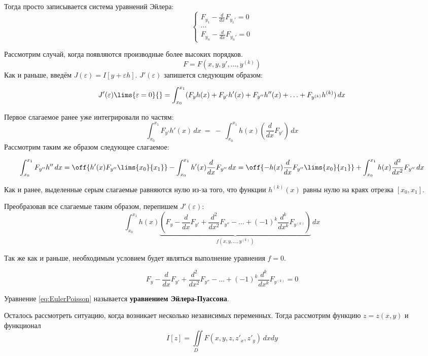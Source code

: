 	Тогда просто записывается система уравнений Эйлера:
	$$\left\{
	  \begin{aligned}
	  	  F_{y_1} - \frac{d}{dx}F_{y_1'} = 0 \\
	  	  \dots\\
	  	  F_{y_n} - \frac{d}{dx}F_{y_n'} = 0
	  \end{aligned}
	  \right.$$
	
	Рассмотрим случай, когда появляются производные более высоких порядков. 
	$$F = F(x, y, y', \ldots, y^{(k)})$$	
	Как и раньше, введём $J(\varepsilon) = I[y + \varepsilon h]$. $J'(\varepsilon)$ запишется следующим образом:
	
	$$J'(\varepsilon)\lims{\varepsilon = 0}{} = \int_{x_0}^{x_1} (F_y h(x) + F_{y'}h'(x) 
	  + F_{y''}h''(x) + \ldots + F_{y^{(k)}}h^{(k)})\,dx$$
	
	Первое слагаемое ранее уже интегрировали по частям: 
	$$\int_{x_0}^{x_1} F_{y'}h'(x)\,dx~=~-~\int_{x_0}^{x_1} h(x)\left(\frac{d}{dx} F_{y'}\right)\,dx$$
	Рассмотрим таким же образом следующее слагаемое:
	
	$$\int_{x_0}^{x_1} F_{y''}h'' \,dx = \off{h'(x)F_{y''}\lims{x_0}{x_1}} - \int_{x_0}^{x_1} h'(x)\frac{d}{dx}F_{y''} \,dx
	  = \off{-h(x)\frac{d}{dx} F_{y''}\lims{x_0}{x_1}} + \int_{x_0}^{x_1} h(x) \frac{d^2}{dx^2}F_{y''} \,dx$$
	  
	Как и ранее, выделенные серым слагаемые равняются нулю из-за того, что
	функции $h^{(k)}(x)$ равны нулю на краях отрезка $[x_0, x_1]$.
	
	Преобразовав все слагаемые таким образом, перепишем $J'(\varepsilon)$:
	$$\int_{x_0}^{x_1} h(x)
	  \underbrace{\left(F_y - \frac{d}{dx}F_{y'} + \frac{d^2}{dx^2}F_{y''} - 
	  \ldots + (-1)^k\frac{d^k}{dx^k}F_{y^{(k)}}\right)}_{f(x, y, \ldots, y^{(k)})} \,dx$$
	
	Так же как и раньше, необходимым условием будет являться выполнение уравнения $f = 0$.
	
	\begin{equation} \label{eq:EulerPoisson}
		F_y - \frac{d}{dx}F_{y'} + \frac{d^2}{dx^2}F_{y''} - 
	  \ldots + (-1)^k\frac{d^k}{dx^k}F_{y^{(k)}} = 0
	\end{equation}
	
	Уравнение \ref{eq:EulerPoisson} называется \textbf{уравнением Эйлера-Пуассона}.
	
	Осталось рассмотреть ситуацию, когда возникает несколько независимых переменных. Тогда рассмотрим функцию
	$z = z(x,y)$ и функционал
	$$I[z] = \underset{D\hspace{10pt}}{\iint} F(x, y, z, z'_x, z'_y) \,dxdy$$
	
